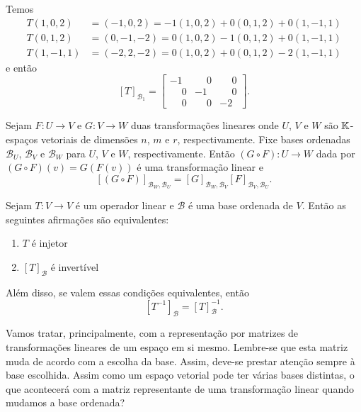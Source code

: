 \begin{exemplos}
\begin{enumerate}[label={\arabic*})]
\begin{solucao}
            Temos
            \begin{align*}
                T(1, 0, 2) &= (-1, 0, 2) = -1(1, 0, 2) + 0(0, 1, 2) + 0(1, -1, 1)\\
                T(0, 1, 2) &= (0, -1, -2) = 0(1, 0, 2) - 1(0, 1, 2) + 0(1, -1, 1)\\
                T(1, -1, 1) &= (-2, 2, -2) = 0(1, 0, 2) + 0(0, 1, 2) - 2(1, -1, 1)
            \end{align*}
            e então
            \[
                [T]_{\mathcal{B}_1} = \begin{bmatrix}-1 & \phantom{-}0 & \phantom{-}0\\\phantom{-}0 & -1 & \phantom{-}0\\\phantom{-}0 & \phantom{-}0 & -2\end{bmatrix}.
            \]
        \end{solucao}
    \end{enumerate}
\end{exemplos}

\begin{teorema}\label{matriz_da_composicao_de_transformacoes}
    Sejam $F \colon U \to V$ e $G \colon V \to W$ duas transformações lineares onde $U$, $V$ e $W$ são $\mathbb{K}$-espaços vetoriais de dimensões $n$, $m$ e $r$, respectivamente. Fixe bases ordenadas $\mathcal{B}_U$, $\mathcal{B}_V$ e $\mathcal{B}_W$ para $U$, $V$ e $W$, respectivamente. Então $(G \circ F) \colon U \to W$ dada por $(G\circ F)(v) = G(F(v))$ é uma transformação linear e
    \[
        [(G \circ F)]_{{\mathcal{B}_W},{\mathcal{B}_U}} = [G]_{{\mathcal{B}_W},{\mathcal{B}_V}}[F]_{{\mathcal{B}_V},{\mathcal{B}_U}}.
    \]
\end{teorema}

\begin{teorema}
    Sejam $T \colon V \to V$ é um operador linear e $\mathcal{B}$ é uma base ordenada de $V$. Então as seguintes afirmações são equivalentes:
    \begin{enumerate}[label={\roman*})]
        \item $T$ é injetor
        \item $[T]_\mathcal{B}$ é invertível
    \end{enumerate}
    Além disso, se valem essas condições equivalentes, então
    \[
        [T^{-1}]_\mathcal{B} = [T]_\mathcal{B}^{-1}.
    \]
\end{teorema}

Vamos tratar, principalmente, com a representação por matrizes de transformações lineares de um espaço em si mesmo. Lembre-se que esta matriz muda de acordo com a escolha da base. Assim, deve-se prestar atenção sempre \`a base escolhida. Assim como um espaço vetorial pode ter várias bases distintas, o que acontecerá com a matriz representante de uma transformação linear quando mudamos a base ordenada?

